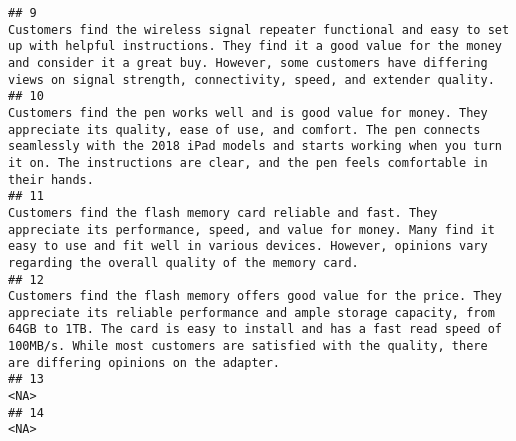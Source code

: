 \documentclass[
]{article}
\begin{document}
\begin{verbatim}
## 9                                                                                                                                                                                                   Customers find the wireless signal repeater functional and easy to set up with helpful instructions. They find it a good value for the money and consider it a great buy. However, some customers have differing views on signal strength, connectivity, speed, and extender quality.
## 10                                                                                                                                                                                          Customers find the pen works well and is good value for money. They appreciate its quality, ease of use, and comfort. The pen connects seamlessly with the 2018 iPad models and starts working when you turn it on. The instructions are clear, and the pen feels comfortable in their hands.
## 11                                                                                                                                                                                                                                Customers find the flash memory card reliable and fast. They appreciate its performance, speed, and value for money. Many find it easy to use and fit well in various devices. However, opinions vary regarding the overall quality of the memory card.
## 12                                                                                                                                                            Customers find the flash memory offers good value for the price. They appreciate its reliable performance and ample storage capacity, from 64GB to 1TB. The card is easy to install and has a fast read speed of 100MB/s. While most customers are satisfied with the quality, there are differing opinions on the adapter.
## 13                                                                                                                                                                                                                                                                                                                                                                                                                                                                                   <NA>
## 14                                                                                                                                                                                                                                                                                                                                                                                                                                                                                   <NA>

\end{verbatim}
\end{document}
